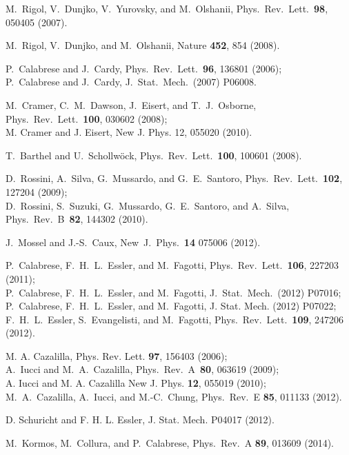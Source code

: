 \documentclass[11pt]{iopart}
\begin{document}
\begin{thebibliography}{99}
M.~Rigol, V.~Dunjko, V.~Yurovsky, and M.~Olshanii, Phys.\ Rev.\ Lett.\ 
{\bf 98}, 050405 (2007). 

M.~Rigol, V.~Dunjko, and M.~Olshanii, Nature {\bf 452}, 854 (2008). 


P.~Calabrese and J.~Cardy, Phys.\ Rev.\ Lett.\ {\bf 96}, 136801 (2006);\\
P.~Calabrese and J.~Cardy, J.\ Stat.\ Mech.\ (2007) P06008.

M.~Cramer, C.~M.~Dawson, J.~Eisert, and T.~J.~Osborne, Phys.\ Rev.\  Lett.\ {\bf 100}, 030602 (2008);\\
M. Cramer and J. Eisert, New J. Phys. 12, 055020 (2010).

T.~Barthel and U.~Schollw\"ock, Phys.\ Rev.\ Lett.\ {\bf 100}, 100601 (2008). 

D.~Rossini, A.~Silva, G.~Mussardo, and G.~E.~Santoro, Phys.\ Rev.\  Lett.\ {\bf 102}, 127204 (2009);\\
D.~Rossini, S.~Suzuki, G.~Mussardo, G.~E.~Santoro, and A.~Silva, Phys.\ Rev.\ B\ {\bf 82}, 144302 (2010).


J.~Mossel and J.-S.~Caux, New\ J.\ Phys.\ {\bf 14} 075006 (2012).

P.~Calabrese, F.~H.~L.~Essler, and M.~Fagotti, Phys.\ Rev.\ Lett.\ {\bf106}, 227203 (2011);\\
P.~Calabrese, F.~H.~L.~Essler, and M.~Fagotti, J.\ Stat.\ Mech.\ (2012) P07016;\\
P.~Calabrese, F.~H.~L.~Essler, and M.~Fagotti, J. Stat. Mech. (2012) P07022;\\
F.~H.~L.~Essler, S.~Evangelisti, and M.~Fagotti, Phys.\ Rev.\ Lett.\  {\bf 109}, 247206 (2012). 

M. A. Cazalilla, Phys. Rev. Lett. {\bf 97}, 156403 (2006);\\
A.~Iucci and M.~A.~Cazalilla, Phys.\ Rev.\ A\ {\bf 80}, 063619 (2009);\\
A. Iucci and M. A. Cazalilla New J. Phys. {\bf 12}, 055019 (2010);\\
M.~A.~Cazalilla, A.~Iucci, and M.-C.~Chung, Phys.\ Rev.\ E {\bf 85},  011133 (2012). 

D. Schuricht and F. H. L. Essler, J. Stat. Mech. P04017 (2012).

M.~Kormos, M.~Collura, and P.~Calabrese, Phys.\ Rev.\ A {\bf 89}, 013609  (2014).


\end{thebibliography}
\end{document}
